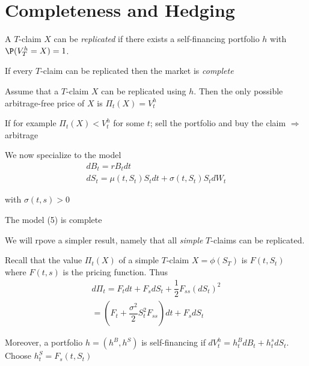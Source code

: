 \section{Completeness and Hedging}
\begin{defo}[]{}
  A $T$-claim $X$ can be \textit{replicated} if there exists a self-financing portfolio $h$ with $\P(V_T^h = X) = 1$.\par
  \noindent If every $T$-claim can be replicated then the market is \textit{complete}
\end{defo}
\par\bigskip
\begin{theo}[]{}
  Assume that a $T$-claim $X$ can be replicated using $h$. Then the only possible arbitrage-free price of $X$ is $\Pi_t(X) = V_t^h$
\end{theo}
\par\bigskip
\begin{prf}[]{}
  If for example $\Pi_t(X)<V_t^h$ for some $t$; sell the portfolio and buy the claim $\Rightarrow$ arbitrage
\end{prf}
\par\bigskip
\noindent We now specialize to the model
\begin{equation}
  \begin{gathered}
    dB_t = rB_tdt\\
    dS_t = \mu(t,S_t)S_tdt + \sigma(t,S_t)S_tdW_t
  \end{gathered}
\end{equation}\par
\noindent with $\sigma(t,s)>0$
\par\bigskip
\begin{theo}[]{}
  The model (5) is complete
\end{theo}
\par\bigskip
\noindent We will rpove a simpler result, namely that all \textit{simple} $T$-claims can be replicated.\par
\noindent Recall that the value $\Pi_t(X)$ of a simple $T$-claim $X = \phi(S_T)$ is $F(t,S_t)$ where $F(t,s)$ is the pricing function. Thus
\begin{equation*}
  \begin{gathered}
    d\Pi_t = F_tdt+F_sdS_t + \dfrac{1}{2}F_{ss}(dS_t)^2\\
    = \left(F_t + \dfrac{\sigma^2}{2}S_t^2F_{ss}\right)dt + F_sdS_t
  \end{gathered}
\end{equation*}\par
\noindent Moreover, a portfolio $h = (h^B, h^S)$ is self-financing if $dV_t^h = h_t^BdB_t+h_t^sdS_t$. Choose $h_t^S = F_s(t,S_t)$
